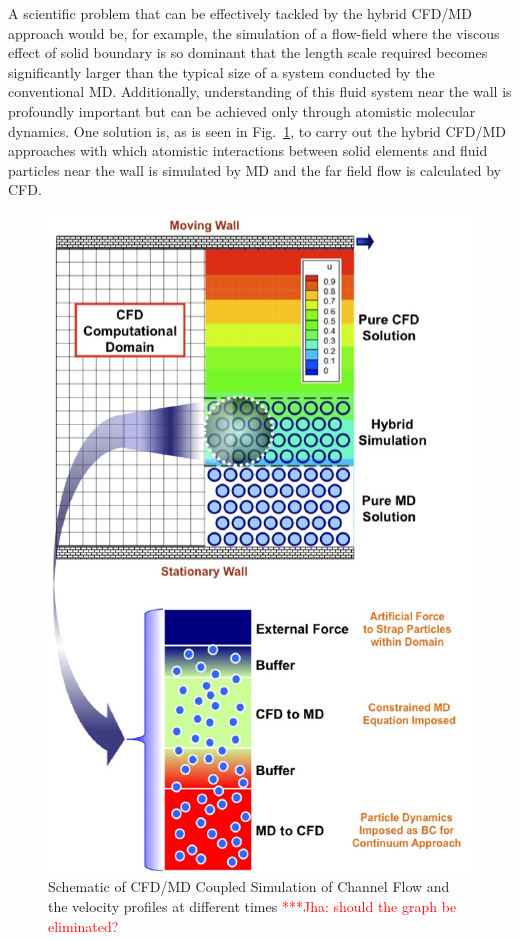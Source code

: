 \documentclass[conference,final]{IEEEtran}
\newcommand{\jhanote}[1]{ {\textcolor{red} { ***Jha: #1 }}}
\newcommand{\jhanote}[1]{}
\begin{document}
A scientific problem that can be effectively tackled by the hybrid
CFD/MD approach would be, for example, the simulation of a flow-field
where the viscous effect of solid boundary is so dominant that the
length scale required becomes significantly larger than the typical
size of a system conducted by the conventional MD. Additionally,
understanding of this fluid system near the wall is profoundly
important but can be achieved only through atomistic molecular
dynamics. One solution is, as is seen in Fig.~\ref{Fig:Couette}, to
carry out the hybrid CFD/MD approaches with which atomistic
interactions between solid elements and fluid particles near the wall
is simulated by MD and the far field flow is calculated by CFD.

\begin{figure}
\centering
\includegraphics[scale=0.33]{fig1.eps}
\caption{\small Schematic of CFD/MD Coupled Simulation of Channel Flow
  and the velocity profiles at different times \jhanote{should the
    graph be eliminated?}}
\label{Fig:Couette}
\end{figure}
\end{document}
